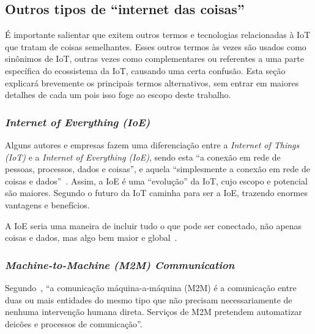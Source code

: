 \documentclass[pdftex, brazil, 12pt, twoside]{article}
\newcommand{\ingles}[1]{\textit{#1}}
\begin{document}
\subsection{Outros tipos de ``internet das coisas''}
\label{o-que-e-iot-outros-tipos}

É importante salientar que exitem outros termos e tecnologias relacionadas à
IoT que tratam de coisas semelhantes. Esses outros termos às vezes são usados
como sinônimos de IoT, outras vezes como complementares ou referentes a uma
parte específica do ecossistema da IoT, causando uma certa confusão. Esta
seção explicará brevemente os principais termos alternativos, sem entrar em
maiores detalhes de cada um pois isso foge ao escopo deste trabalho.


\subsubsection{\ingles{Internet of Everything (IoE)}}
\label{o-que-e-iot-outros-tipos-ioe}

Alguns autores e empresas fazem uma diferenciação entre a \ingles{Internet of Things (IoT)}
e a \ingles{Internet
  of Everything (IoE)}, sendo esta ``a conexão em rede de pessoas, processos,
dados e coisas'', e aquela ``simplesmente a conexão em rede de coisas
e dados''~\citep{CiscoIoEPublicSectorOpportunity,CiscoIoTVS2013,CiscoIoTFAQ2013}.
Assim, a IoE é uma ``evolução'' da IoT, cujo escopo e potencial
são maiores. Segundo \citet{HebraIoTIoE2015} o futuro da IoT caminha para
ser a IoE, trazendo enormes vantagens e benefícios.

A IoE seria uma maneira de incluir tudo o que pode ser conectado, não apenas
coisas e dados, mas algo bem maior e global~\citep{LuethIoT2014}.


\subsubsection{\ingles{Machine-to-Machine (M2M) Communication}}
\label{o-que-e-iot-outros-tipos-m2m}

Segundo~\citet{IEEEIoTDefinition}, ``a comunicação máquina-a-máquina (M2M) é a
comunicação entre duas ou mais entidades do mesmo tipo que não precisam necessariamente de nenhuma
intervenção humana direta. Serviços de M2M pretendem automatizar deicões
e processos de comunicação''.
\end{document}
